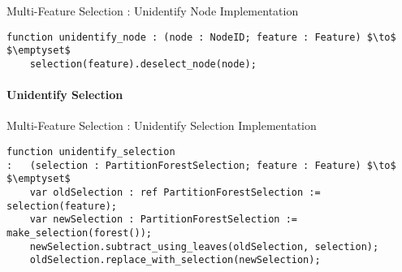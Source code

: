 \begin{stulisting}[H]
\caption{Multi-Feature Selection : Unidentify Node Implementation}
\begin{lstlisting}[style=Default]
function unidentify_node : (node : NodeID; feature : Feature) $\to$ $\emptyset$
	selection(feature).deselect_node(node);
\end{lstlisting}
\end{stulisting}

\paragraph{Unidentify Selection}

\begin{stulisting}[H]
\caption{Multi-Feature Selection : Unidentify Selection Implementation}
\begin{lstlisting}[style=Default]
function unidentify_selection
:	(selection : PartitionForestSelection; feature : Feature) $\to$ $\emptyset$
	var oldSelection : ref PartitionForestSelection := selection(feature);
	var newSelection : PartitionForestSelection := make_selection(forest());
	newSelection.subtract_using_leaves(oldSelection, selection);
	oldSelection.replace_with_selection(newSelection);
\end{lstlisting}
\end{stulisting}
